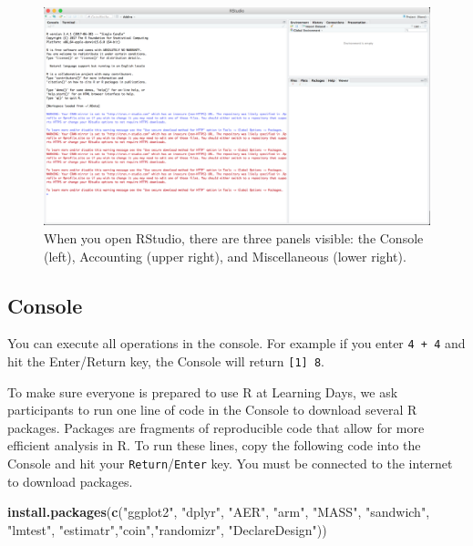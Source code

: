 \documentclass[12pt,]{book}
\newenvironment{Shaded}{\begin{snugshade}}{\end{snugshade}}
\newcommand{\KeywordTok}[1]{\textcolor[rgb]{0.13,0.29,0.53}{\textbf{#1}}}
\newcommand{\NormalTok}[1]{#1}
\newcommand{\StringTok}[1]{\textcolor[rgb]{0.31,0.60,0.02}{#1}}
\begin{document}
\begin{figure}
\includegraphics[width=0.8\linewidth]{Images/rstudio_intro} \caption{When you open RStudio, there are three panels visible: the Console (left), Accounting (upper right), and Miscellaneous (lower right).}\label{fig:rstudiointro}
\end{figure}

\hypertarget{console}{%
\subsection{Console}\label{console}}

You can execute all operations in the console. For example if you enter \texttt{4\ +\ 4} and hit the Enter/Return key, the Console will return \texttt{{[}1{]}\ 8}.

To make sure everyone is prepared to use R at Learning Days, we ask participants to run one line of code in the Console to download several R packages. Packages are fragments of reproducible code that allow for more efficient analysis in R. To run these lines, copy the following code into the Console and hit your \texttt{Return}/\texttt{Enter} key. You must be connected to the internet to download packages.

\begin{Shaded}
\begin{Highlighting}[]
\KeywordTok{install.packages}\NormalTok{(}\KeywordTok{c}\NormalTok{(}\StringTok{"ggplot2"}\NormalTok{, }\StringTok{"dplyr"}\NormalTok{, }\StringTok{"AER"}\NormalTok{, }\StringTok{"arm"}\NormalTok{, }\StringTok{"MASS"}\NormalTok{, }\StringTok{"sandwich"}\NormalTok{, }
                   \StringTok{"lmtest"}\NormalTok{, }\StringTok{"estimatr"}\NormalTok{,}\StringTok{"coin"}\NormalTok{,}\StringTok{"randomizr"}\NormalTok{, }\StringTok{"DeclareDesign"}\NormalTok{))}
\end{Highlighting}
\end{Shaded}
\end{document}
